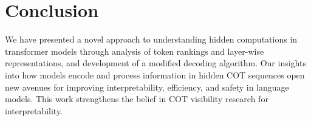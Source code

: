 \documentclass[10pt,a4paper]{article}
\begin{document}
\section{Conclusion}
We have presented a novel approach to understanding hidden computations in transformer models through analysis of token rankings and layer-wise representations, and development of a modified decoding algorithm. Our insights into how models encode and process information in hidden COT sequences open new avenues for improving interpretability, efficiency, and safety in language models. This work strengthens the belief in COT visibility research for interpretability.
\end{document}
